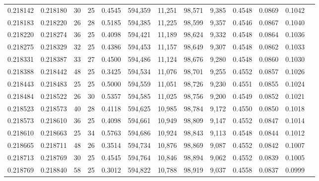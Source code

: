 \begin{tabular}{rrrrrrrrrrrrr}
0.218142 & 0.218180 &  30 &  25 &                                     0.4545 & 594,359 &  11,251 &  98,571 &   9,385 & 0.4548 & 0.0869 & 0.1042 \\
0.218183 & 0.218220 &  26 &  28 &                                     0.5185 & 594,385 &  11,225 &  98,599 &   9,357 & 0.4546 & 0.0867 & 0.1040 \\
0.218220 & 0.218274 &  36 &  25 &                                     0.4098 & 594,421 &  11,189 &  98,624 &   9,332 & 0.4548 & 0.0864 & 0.1036 \\
0.218275 & 0.218329 &  32 &  25 &                                     0.4386 & 594,453 &  11,157 &  98,649 &   9,307 & 0.4548 & 0.0862 & 0.1033 \\
0.218331 & 0.218387 &  33 &  27 &                                     0.4500 & 594,486 &  11,124 &  98,676 &   9,280 & 0.4548 & 0.0860 & 0.1030 \\
0.218388 & 0.218442 &  48 &  25 &                                     0.3425 & 594,534 &  11,076 &  98,701 &   9,255 & 0.4552 & 0.0857 & 0.1026 \\
0.218443 & 0.218483 &  25 &  25 &                                     0.5000 & 594,559 &  11,051 &  98,726 &   9,230 & 0.4551 & 0.0855 & 0.1024 \\
0.218484 & 0.218522 &  26 &  30 &                                     0.5357 & 594,585 &  11,025 &  98,756 &   9,200 & 0.4549 & 0.0852 & 0.1021 \\
0.218523 & 0.218573 &  40 &  28 &                                     0.4118 & 594,625 &  10,985 &  98,784 &   9,172 & 0.4550 & 0.0850 & 0.1018 \\
0.218573 & 0.218610 &  36 &  25 &                                     0.4098 & 594,661 &  10,949 &  98,809 &   9,147 & 0.4552 & 0.0847 & 0.1014 \\
0.218610 & 0.218663 &  25 &  34 &                                     0.5763 & 594,686 &  10,924 &  98,843 &   9,113 & 0.4548 & 0.0844 & 0.1012 \\
0.218665 & 0.218711 &  48 &  26 &                                     0.3514 & 594,734 &  10,876 &  98,869 &   9,087 & 0.4552 & 0.0842 & 0.1007 \\
0.218713 & 0.218769 &  30 &  25 &                                     0.4545 & 594,764 &  10,846 &  98,894 &   9,062 & 0.4552 & 0.0839 & 0.1005 \\
0.218769 & 0.218840 &  58 &  25 &                                     0.3012 & 594,822 &  10,788 &  98,919 &   9,037 & 0.4558 & 0.0837 & 0.0999 \\

\end{tabular}
